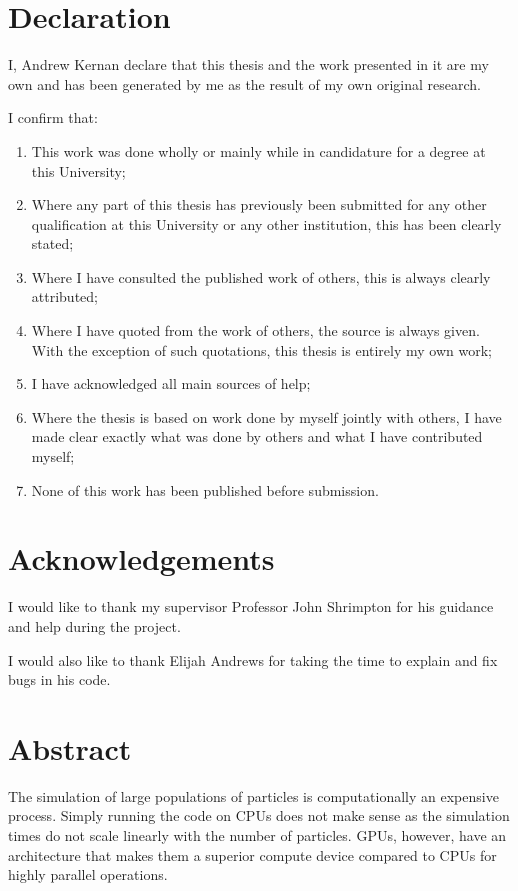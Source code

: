 \documentclass[a4paper, 11pt]{article}
\numberwithin{equation}{section}
\numberwithin{figure}{section}
\numberwithin{table}{section}
\begin{document}


\hypertarget{dec}{\section*{Declaration}\label{dec}}
I, Andrew Kernan declare that this thesis and the work presented in it are my own and has been generated by me as the result of my own original research.

I confirm that:
\begin{enumerate}
	\item This work was done wholly or mainly while in candidature for a degree at this University;
	\item Where any part of this thesis has previously been submitted for any other qualification at this University or any other institution, this has been clearly stated;
	\item Where I have consulted the published work of others, this is always clearly attributed;
	\item Where I have quoted from the work of others, the source is always given. With the exception of such quotations, this thesis is entirely my own work;
	\item I have acknowledged all main sources of help;
	\item Where the thesis is based on work done by myself jointly with others, I have made clear exactly what was done by others and what I have contributed myself;
	\item None of this work has been published before submission.
\end{enumerate}

\newpage

\hypertarget{ack}{\section*{Acknowledgements}\label{ack}}
I would like to thank my supervisor Professor John Shrimpton for his guidance and help during the project.

I would also like to thank Elijah Andrews for taking the time to explain and fix bugs in his code.

\newpage

{
	\setcounter{tocdepth}{3}
	\tableofcontents
}

\newpage

\hypertarget{abs}{\section*{Abstract}\label{abs}}
The simulation of large populations of particles is computationally an expensive process. Simply running the code on CPUs does not make sense as the simulation times do not scale linearly with the number of particles. GPUs, however, have an architecture that makes them a superior compute device compared to CPUs for highly parallel operations.
\end{document}
